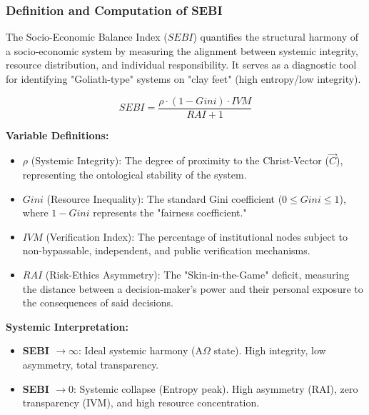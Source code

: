 \documentclass[11pt,a4paper]{article}
\theoremstyle{definition}
\theoremstyle{remark}
\begin{document}
\subsubsection*{Definition and Computation of SEBI}

The Socio-Economic Balance Index ($SEBI$) quantifies the structural harmony of a socio-economic system by measuring the alignment between systemic integrity, resource distribution, and individual responsibility. It serves as a diagnostic tool for identifying "Goliath-type" systems on "clay feet" (high entropy/low integrity).

\begin{equation}
SEBI = \frac{\rho \cdot (1 - Gini) \cdot IVM}{RAI + 1}
\end{equation}

\textbf{Variable Definitions:}
\begin{itemize}
    \item $\rho$ (Systemic Integrity): The degree of proximity to the Christ-Vector ($\vec{C}$), representing the ontological stability of the system.
    \item $Gini$ (Resource Inequality): The standard Gini coefficient ($0 \leq Gini \leq 1$), where $1-Gini$ represents the "fairness coefficient."
    \item $IVM$ (Verification Index): The percentage of institutional nodes subject to non-bypassable, independent, and public verification mechanisms.
    \item $RAI$ (Risk-Ethics Asymmetry): The "Skin-in-the-Game" deficit, measuring the distance between a decision-maker's power and their personal exposure to the consequences of said decisions.
\end{itemize}

\textbf{Systemic Interpretation:}
\begin{itemize}
    \item \textbf{SEBI $\to \infty$}: Ideal systemic harmony (A$\Omega$ state). High integrity, low asymmetry, total transparency.
    \item \textbf{SEBI $\to 0$}: Systemic collapse (Entropy peak). High asymmetry (RAI), zero transparency (IVM), and high resource concentration.
\end{itemize}
\end{document}
